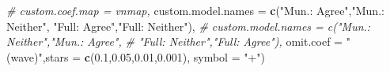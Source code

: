 \documentclass[
]{article}
\newenvironment{Shaded}{\begin{snugshade}}{\end{snugshade}}
\newcommand{\CommentTok}[1]{\textcolor[rgb]{0.56,0.35,0.01}{\textit{#1}}}
\newcommand{\DataTypeTok}[1]{\textcolor[rgb]{0.13,0.29,0.53}{#1}}
\newcommand{\FloatTok}[1]{\textcolor[rgb]{0.00,0.00,0.81}{#1}}
\newcommand{\KeywordTok}[1]{\textcolor[rgb]{0.13,0.29,0.53}{\textbf{#1}}}
\newcommand{\NormalTok}[1]{#1}
\newcommand{\StringTok}[1]{\textcolor[rgb]{0.31,0.60,0.02}{#1}}
\begin{document}
\begin{Shaded}
\begin{Highlighting}[]
          \CommentTok{# custom.coef.map = vnmap,}
          \DataTypeTok{custom.model.names =} \KeywordTok{c}\NormalTok{(}\StringTok{"Mun.: Agree"}\NormalTok{,}\StringTok{"Mun.: Neither"}\NormalTok{,}
                                 \StringTok{"Full: Agree"}\NormalTok{,}\StringTok{"Full: Neither"}\NormalTok{),}
          \CommentTok{# custom.model.names = c("Mun.: Neither","Mun.: Agree",}
          \CommentTok{#                        "Full: Neither","Full: Agree"),}
          \DataTypeTok{omit.coef =} \StringTok{"(wave)"}\NormalTok{,}\DataTypeTok{stars =} \KeywordTok{c}\NormalTok{(}\FloatTok{0.1}\NormalTok{,}\FloatTok{0.05}\NormalTok{,}\FloatTok{0.01}\NormalTok{,}\FloatTok{0.001}\NormalTok{), }\DataTypeTok{symbol =} \StringTok{"+"}\NormalTok{)}
\end{Highlighting}
\end{Shaded}
\end{document}
